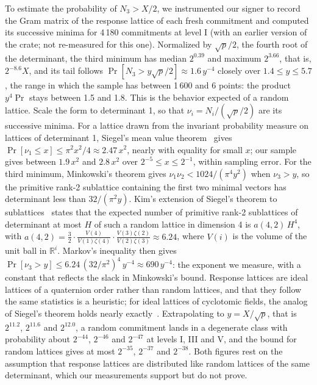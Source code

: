 \documentclass[version=preprint]{iacrcc}
\begin{document}
    To estimate the probability of $N_3 > X/2$, we instrumented our signer to
    record the Gram matrix of the response lattice of each fresh commitment
    and computed its successive minima for 4\,180 commitments at level I
    (with an earlier version of the crate; not re-measured for this one).
    Normalized by $\sqrt{p}/2$, the fourth root of the determinant, the third
    minimum has median $2^{0.39}$ and maximum $2^{3.66}$, that is, $2^{-8.6}X$,
    and its tail follows $\Pr[N_3 > y\sqrt{p}/2] \approx 1.6\,y^{-4}$ closely
    over $1.4 \le y \le 5.7$, the range in which the sample has between 1\,600
    and 6 points: the product $y^4 \Pr$ stays between 1.5 and 1.8. This is
    the behavior expected of a random lattice. Scale the form to determinant
    1, so that $\nu_i = N_i/(\sqrt p/2)$ are its successive minima. For a
    lattice drawn from the invariant probability measure on lattices of
    determinant 1, Siegel's mean value theorem~\cite{Sie45} gives
    $\Pr[\nu_1 \le x] \le \pi^2 x^2/4 \approx 2.47\,x^2$, nearly with
    equality for small $x$; our sample gives between $1.9\,x^2$ and
    $2.8\,x^2$ over $2^{-5} \le x \le 2^{-1}$, within sampling error. For the third
    minimum, Minkowski's theorem gives $\nu_1 \nu_2 < 1024/(\pi^4 y^2)$
    when $\nu_3 > y$, so the primitive rank-2 sublattice containing the first
    two minimal vectors has determinant less than $32/(\pi^2 y)$. Kim's
    extension of Siegel's theorem to sublattices~\cite[Theorem 3]{Kim22}
    states that the expected number of primitive rank-2 sublattices of
    determinant at most $H$ of such a random lattice in dimension 4 is
    $a(4, 2)\,H^4$, with $a(4, 2) = \frac{3}{2} \cdot
    \frac{V(4)}{V(1)\zeta(4)} \cdot \frac{V(3)\zeta(2)}{V(2)\zeta(3)}
    \approx 6.24$, where $V(i)$ is the volume of the unit ball in
    $\mathbb{R}^i$. Markov's inequality then gives $\Pr[\nu_3 > y] \le
    6.24\,(32/\pi^2)^4\,y^{-4} \approx 690\,y^{-4}$: the exponent we
    measure, with a constant that reflects the slack in Minkowski's bound.
    Response lattices are ideal lattices of a quaternion order rather than
    random lattices, and that they follow the same statistics is a
    heuristic; for ideal lattices of cyclotomic fields, the analog of Siegel's
    theorem holds nearly exactly~\cite{GV24}. Extrapolating to $y = X/\sqrt p$, that is
    $2^{11.2}$, $2^{11.6}$ and $2^{12.0}$, a random commitment lands in a
    degenerate class with probability about $2^{-44}$, $2^{-46}$ and
    $2^{-47}$ at levels I, III and V, and the bound for random lattices
    gives at most $2^{-35}$, $2^{-37}$ and $2^{-38}$. Both figures rest on
    the assumption that response lattices are distributed like random
    lattices of the same determinant, which our measurements support but do
    not prove.
\end{document}
